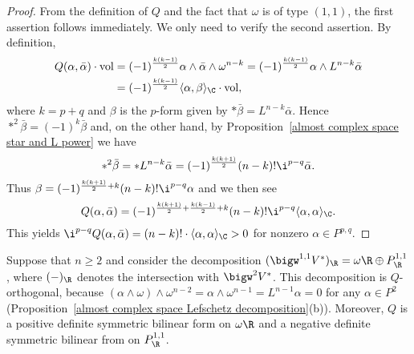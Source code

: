\begin{proof}
From the definition of $Q$ and the fact that $\omega$ is of type $(1,1)$, the first assertion follows immediately. We only need to verify the second assertion. By definition,
\begin{align*}
Q(\alpha,\bar{\alpha})\cdot\mathrm{vol}&=(-1)^{\frac{k(k-1)}{2}}\alpha\wedge\bar{\alpha}\wedge\omega^{n-k}=(-1)^{\frac{k(k-1)}{2}}\alpha\wedge L^{n-k}\bar{\alpha}\\
&=(-1)^{\frac{k(k-1)}{2}}\langle\alpha,\beta\rangle_{\C}\cdot\mathrm{vol},
\end{align*}
where $k=p+q$ and $\beta$ is the $p$-form given by $\ast\bar{\beta}=L^{n-k}\bar{\alpha}$. Hence $\ast^2\bar{\beta}=(-1)^k\bar{\beta}$ and, on the other hand, by Proposition~\ref{almost complex space star and L power} we have
\[\ast^2\bar{\beta}=\ast L^{n-k}\bar{\alpha}=(-1)^{\frac{k(k+1)}{2}}(n-k)!\i^{p-q}\bar{\alpha}.\]
Thus $\beta=(-1)^{\frac{k(k+1)}{2}+k}(n-k)!\i^{p-q}\alpha$ and we then see
\[Q(\alpha,\bar{\alpha})=(-1)^{\frac{k(k+1)}{2}+\frac{k(k-1)}{2}+k}(n-k)!\i^{p-q}\langle\alpha,\alpha\rangle_{\C}.\]
This yields $\i^{p-q}Q(\alpha,\bar{\alpha})=(n-k)!\cdot\langle\alpha,\alpha\rangle_{\C}>0$ for nonzero $\alpha\in P^{p,q}$.
\end{proof}
\begin{example}
Suppose that $n\geq 2$ and consider the decomposition $(\bigw^{1,1}V^*)_{\R}=\omega\R\oplus P^{1,1}_{\R}$, where $(-)_{\R}$ denotes the intersection with $\bigw^2V^*$. This decomposition is $Q$-orthogonal, because $(\alpha\wedge\omega)\wedge\omega^{n-2}=\alpha\wedge\omega^{n-1}=L^{n-1}\alpha=0$ for any $\alpha\in P^2$ (Proposition~\ref{almost complex space Lefschetz decomposition}(b)). Moreover, $Q$ is a positive definite symmetric bilinear form on $\omega\R$ and a negative definite symmetric bilinear from on $P^{1,1}_{\R}$.
\end{example}
